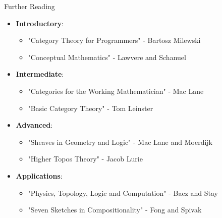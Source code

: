 \documentclass{beamer}
\begin{document}
    \begin{frame}{Further Reading}
    \begin{itemize}
        \item \textbf{Introductory}:
            \begin{itemize}
                \item "Category Theory for Programmers" - Bartosz Milewski
                \item "Conceptual Mathematics" - Lawvere and Schanuel
            \end{itemize}
        \item \textbf{Intermediate}:
            \begin{itemize}
                \item "Categories for the Working Mathematician" - Mac Lane
                \item "Basic Category Theory" - Tom Leinster
            \end{itemize}
        \item \textbf{Advanced}:
            \begin{itemize}
                \item "Sheaves in Geometry and Logic" - Mac Lane and Moerdijk
                \item "Higher Topos Theory" - Jacob Lurie
            \end{itemize}
        \item \textbf{Applications}:
            \begin{itemize}
                \item "Physics, Topology, Logic and Computation" - Baez and Stay
                \item "Seven Sketches in Compositionality" - Fong and Spivak
            \end{itemize}
    \end{itemize}
    \end{frame}
        
\end{document}

